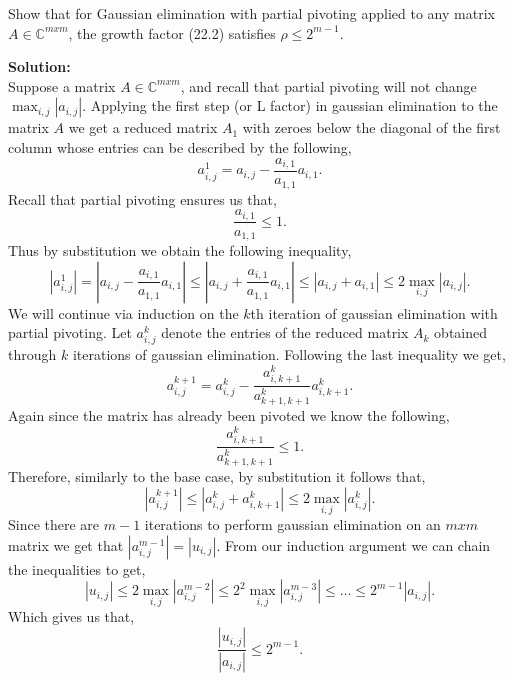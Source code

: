 \documentclass[12pt]{article}
\makeatletter
\theoremstyle{homework}
\newenvironment{exercise}[1]
{\def\@currentlabel{#1}\exercisecore}
{\endexercisecore}
\newcommand{\localhead}[1]{\par\smallskip\noindent\textbf{#1}\nobreak\\}%
\newcommand\solution{\localhead{Solution:}}
\newcommand{\Cplx}{\ensuremath{\mathbb C}}
\let\CC\Cplx
\makeatother
\begin{document}
\vspace{1in}



\begin{exercise}{22.1} Show that for Gaussian elimination with partial pivoting applied to any matrix $A \in \CC^{mxm}$, the growth factor (22.2) satisfies
  $\rho \leq 2^{m-1}$.\\
  \solution Suppose a matrix $A \in \CC^{mxm}$, and recall that partial pivoting will not change $\max_{i,j}|a_{i,j}|$. Applying the first step (or L factor) in gaussian elimination to 
  the matrix $A$ we get a reduced matrix $A_1$ with zeroes below the diagonal of the first column whose entries can be described by the following, 
  \begin{equation*}
    a^1_{i,j} = a_{i,j} - \dfrac{a_{i, 1}}{a_{1,1}}a_{i,1}.
  \end{equation*}
  Recall that partial pivoting ensures us that, 
  \begin{equation*}
    \dfrac{a_{i, 1}}{a_{1,1}} \leq 1.
  \end{equation*}
  Thus by substitution we obtain the following inequality, 
  \begin{equation*}
    |a^1_{i,j}| = |a_{i,j} - \dfrac{a_{i, 1}}{a_{1,1}}a_{i,1}| \leq |a_{i,j} + \dfrac{a_{i, 1}}{a_{1,1}}a_{i,1}|  \leq |a_{i,j} + a_{i,1}| \leq 2 \max_{i,j}|a_{i,j}|.
  \end{equation*}
  We will continue via induction on the $k$th iteration of gaussian elimination with partial pivoting. Let $a^k_{i,j}$ denote the entries of the reduced matrix $A_k$ obtained through $k$ iterations of gaussian elimination. Following the last inequality we get, 
  \begin{equation*}
    a^{k+1}_{i,j} = a^{k}_{i,j} - \dfrac{a^{k}_{i, k+1}}{a^{k}_{k+1,k+1}}a^{k}_{i,k+1}.
  \end{equation*}
  Again since the matrix has already been pivoted we know the following, 
  \begin{equation*}
    \dfrac{a^{k}_{i, k+1}}{a^{k}_{k+1,k+1}} \leq 1.
  \end{equation*}
  Therefore, similarly to the base case, by substitution it follows that, 
  \begin{equation*}
    |a^{k+1}_{i,j}| \leq |a^{k}_{i,j} + a^{k}_{i,k+1}| \leq 2 \max_{i,j}|a^k_{i,j}|.
  \end{equation*}
  Since there are $m-1$ iterations to perform gaussian elimination on an $mxm$ matrix we get that  $|a^{m-1}_{i,j}| = |u_{i,j}|$. From our induction argument we can chain the inequalities to get, 
  \begin{equation*}
    |u_{i,j}| \leq 2 \max_{i,j}|a^{m-2}_{i,j}| \leq 2^2 \max_{i,j}|a^{m-3}_{i,j}| \leq \dots \leq 2^{m-1}|a_{i,j}|.
  \end{equation*}
  Which gives us that, 
  \begin{equation*}
    \dfrac{|u_{i,j}|}{|a_{i,j}|} \leq 2^{m-1}.
  \end{equation*}
\end{exercise}
\vspace{1in}
\end{document}
